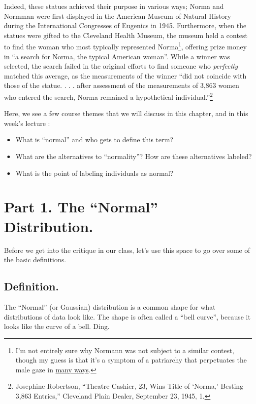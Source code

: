 \documentclass[
  letterpaper,
  DIV=11,
  numbers=noendperiod,
  oneside]{scrreprt}
\begin{document}
Indeed, these statues achieved their purpose in various ways; Norma and
Normman were first displayed in the American Museum of Natural History
during the International Congresses of Eugenics in 1945. Furthermore,
when the statues were gifted to the Cleveland Health Museum, the museum
held a contest to find the woman who most typically represented
Norma\footnote{I'm not entirely sure why Normann was not subject to a
  similar contest, though my guess is that it's a symptom of a
  patriarchy that perpetuates the male gaze in
  \href{https://www.youtube.com/watch?v=ulsjuiFO2J0}{many ways}.},
offering prize money in ``a search for Norma, the typical American
woman''. While a winner was selected, the search failed in the original
efforts to find someone who \emph{perfectly} matched this average, as
the measurements of the winner ``did not coincide with those of the
statue. . . . after assessment of the measurements of 3,863 women who
entered the search, Norma remained a hypothetical
individual.''\footnote{Josephine Robertson, ``Theatre Cashier, 23, Wins
  Title of `Norma,' Besting 3,863 Entries,'' Cleveland Plain Dealer,
  September 23, 1945, 1.}

Here, we see a few course themes that we will discuss in this chapter,
and in this week's lecture :

\begin{itemize}
\item
  What is ``normal'' and who gets to define this term?
\item
  What are the alternatives to ``normality''? How are these alternatives
  labeled?
\item
  What is the point of labeling individuals as normal?
\end{itemize}

\chapter{Part 1. The ``Normal''
Distribution.}\label{part-1.-the-normal-distribution.}

Before we get into the critique in our class, let's use this space to go
over some of the basic definitions.

\section{Definition.}\label{definition.-3}

The ``Normal'' (or Gaussian) distribution is a common shape for what
distributions of data look like. The shape is often called a ``bell
curve'', because it looks like the curve of a bell. Ding.
\end{document}
